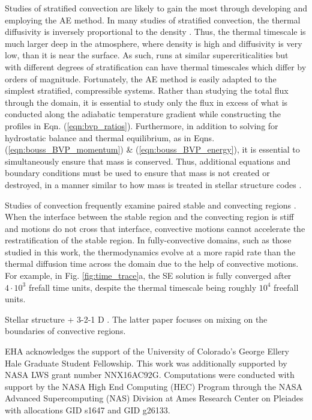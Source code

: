 \documentclass[aps, pre, onecolumn, nofootinbib, notitlepage, groupedaddress, amsfonts, amssymb, amsmath, longbibliography]{revtex4-1}
\begin{document}
Studies of stratified convection are likely to gain the most through
developing and employing the AE method.
In many studies of stratified convection, the thermal diffusivity
is inversely proportional to the density \cite{anders&brown2017}. Thus, the
thermal timescale is much larger deep in the atmosphere, where density is high and diffusivity
is very low, than it is near the surface.  As such, runs at similar supercriticalities
but with different degrees of stratification can have thermal timescales which
differ by orders of magnitude.  Fortunately, the AE method is easily adapted to
the simplest stratified, compressible systems.  Rather than studying the total
flux through the domain, it is essential to study only the flux in excess of 
what is conducted along the adiabatic temperature gradient while constructing
the profiles in Eqn. (\ref{eqn:bvp_ratios}).  
Furthermore, in addition to solving for
hydrostatic balance and thermal equilibrium, as in Eqns. (\ref{eqn:bouss_BVP_momentum})
\& (\ref{eqn:bouss_BVP_energy}), it is essential to simultaneously
ensure that mass is conserved.  Thus, additional equations and boundary conditions
must be used to ensure that mass is not created or destroyed,
in a manner similar to how mass is treated in stellar structure codes
\cite{paxton&all2011}.

Studies of convection frequently examine paired stable and convecting regions
\cite{hurlburt&all1986, brandenburg&all2005, couston&all2017}.
When the interface between the stable region
and the convecting region is stiff and motions do not cross that interface,
convective motions cannot accelerate the restratification of the stable region.
In fully-convective domains, such as those studied in this work, the thermodynamics evolve
at a more rapid rate than the thermal diffusion time across the domain due to
the help of convective motions.  For example, in Fig. \ref{fig:time_trace}a,
the SE solution is fully converged after $4\cdot 10^3$ frefall time units,
despite the thermal timescale being roughly $10^4$ freefall units.

Stellar structure + 3-2-1 D \cite{arnett&all2015, cristini&all2016}. The
latter paper focuses on mixing on the boundaries of convective regions.

\begin{acknowledgments}
EHA acknowledges the support of the University of Colorado's George 
Ellery Hale Graduate Student Fellowship.
This work was additionally supported by  NASA LWS grant number NNX16AC92G.  
Computations were conducted 
with support by the NASA High End Computing (HEC) Program through the NASA 
Advanced Supercomputing (NAS) Division at Ames Research Center on Pleiades
with allocations GID s1647 and GID g26133.
\end{acknowledgments}
\end{document}
